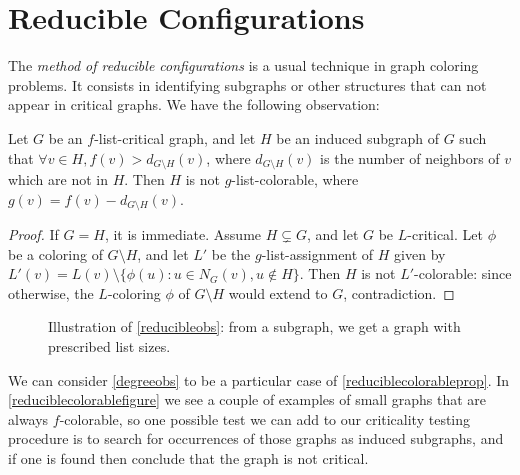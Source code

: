 \section{Reducible Configurations}

The \emph{method of reducible configurations} is a usual technique in graph coloring problems. It consists in identifying subgraphs 
or other structures that can not appear in critical graphs. We have the following observation:

\begin{proposition}
\label{reduciblecolorableprop}
Let $G$ be an $f$-list-critical graph, and let $H$ be an induced subgraph of $G$ such that $\forall v \in H, f(v) > d_{G\setminus H}(v)$,
where $d_{G \setminus H}(v)$ is the number of neighbors of $v$ which are not in $H$. Then $H$ is not $g$-list-colorable, where $g(v) = f(v) -d_{G\setminus H}(v)$.
\end{proposition}

\begin{proof}
If $G = H$, it is immediate. Assume $H \subsetneq G$, and let $G$ be $L$-critical. 
Let $\phi$ be a coloring of $G \setminus H$, and let $L'$ be the $g$-list-assignment of $H$ given by 
$L'(v) = L(v) \setminus \{\phi(u) : u \in N_G(v), u \not\in H\}$. 
Then $H$ is not $L'$-colorable: since otherwise, the $L$-coloring $\phi$ of $G \setminus H$ would extend to $G$, contradiction.
\end{proof}

\begin{figure}
\centering
\begin{tikzpicture}[scale=0.8]

\end{tikzpicture}
\begin{tikzpicture}[scale=0.8]

\end{tikzpicture}
\caption{Illustration of \ref{reducibleobs}: from a subgraph, we get a graph with prescribed list sizes.}
\end{figure}

We can consider \ref{degreeobs} to be a particular case of \ref{reduciblecolorableprop}. 
In \ref{reduciblecolorablefigure} we see a couple of examples of small graphs that are always $f$-colorable,
so one possible test we can add to our criticality testing procedure is to search for occurrences of those graphs as induced subgraphs,
and if one is found then conclude that the graph is not critical.




